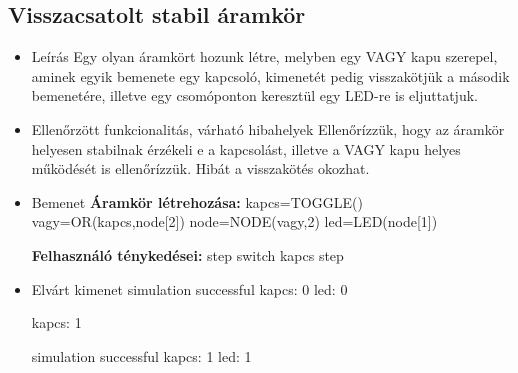 \subsection{Visszacsatolt stabil áramkör}
\begin{itemize}
\item Leírás\newline
Egy olyan áramkört hozunk létre, melyben egy VAGY kapu szerepel, aminek egyik bemenete egy kapcsoló, kimenetét pedig visszakötjük a második bemenetére, illetve egy csomóponton keresztül egy LED-re is eljuttatjuk.
\item Ellenőrzött funkcionalitás, várható hibahelyek\newline
Ellenőrízzük, hogy az áramkör helyesen stabilnak érzékeli e a kapcsolást, illetve a VAGY kapu helyes működését is ellenőrízzük. Hibát a visszakötés okozhat.
\item Bemenet\newline
\newline
{\bf Áramkör létrehozása:}\newline
kapcs=TOGGLE()\newline
vagy=OR(kapcs,node[2])\newline
node=NODE(vagy,2)\newline
led=LED(node[1])\newline

{\bf Felhasználó ténykedései:}\newline
step\newline
switch kapcs\newline
step

\item Elvárt kimenet\newline
simulation successful\newline
kapcs: 0\newline
led: 0\newline

kapcs: 1\newline

simulation successful\newline
kapcs: 1\newline
led: 1\newline
\end{itemize}



